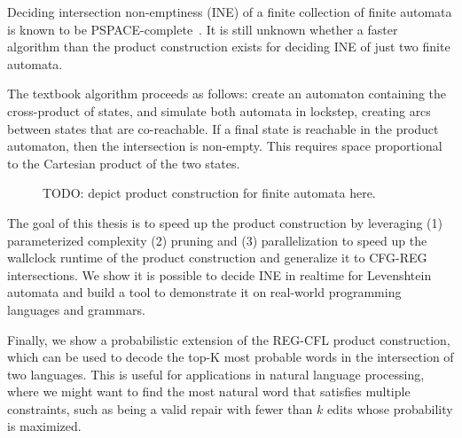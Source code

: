 Deciding intersection non-emptiness (INE) of a finite collection of finite automata is known to be PSPACE-complete~\cite{kozen1977lower}. It is still unknown whether a faster algorithm than the product construction exists for deciding INE of just two finite automata.

The textbook algorithm proceeds as follows: create an automaton containing the cross-product of states, and simulate both automata in lockstep, creating arcs between states that are co-reachable. If a final state is reachable in the product automaton, then the intersection is non-empty. This requires space proportional to the Cartesian product of the two states.

\begin{figure}[h]
  \caption{TODO: depict product construction for finite automata here.}
  \end{figure}

The goal of this thesis is to speed up the product construction by leveraging (1) parameterized complexity (2) pruning and (3) parallelization to speed up the wallclock runtime of the product construction and generalize it to CFG-REG intersections. We show it is possible to decide INE in realtime for Levenshtein automata and build a tool to demonstrate it on real-world programming languages and grammars.

Finally, we show a probabilistic extension of the REG-CFL product construction, which can be used to decode the top-K most probable words in the intersection of two languages. This is useful for applications in natural language processing, where we might want to find the most natural word that satisfies multiple constraints, such as being a valid repair with fewer than $k$ edits whose probability is maximized.

\clearpage